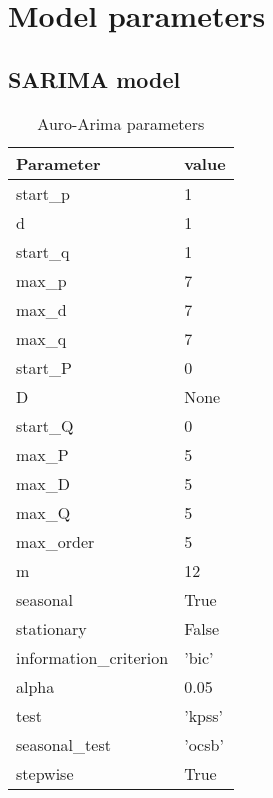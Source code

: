 \section{Model parameters}
\label{appendix:Model-Parameters}


\subsection{SARIMA model}

\begin{table}[H]
  \centering
  \caption{Auro-Arima parameters}
  \label{table:auto-arima-parameters}
  \begin{tabular}{|l|l|}\hline
    Parameter              & value   \\ \hline
    \hline
    start\_p               & 1       \\ \hline
    d                      & 1       \\ \hline
    start\_q               & 1       \\ \hline
    max\_p                 & 7       \\ \hline
    max\_d                 & 7       \\ \hline
    max\_q                 & 7       \\ \hline
    start\_P               & 0       \\ \hline
    D                      & None    \\ \hline
    start\_Q               & 0       \\ \hline
    max\_P                 & 5       \\ \hline
    max\_D                 & 5       \\ \hline
    max\_Q                 & 5       \\ \hline
    max\_order             & 5       \\ \hline
    m                      & 12      \\ \hline
    seasonal               & True    \\ \hline
    stationary             & False   \\ \hline
    information\_criterion & 'bic'   \\ \hline
    alpha                  & 0.05    \\ \hline
    test                   & 'kpss'  \\ \hline
    seasonal\_test         & 'ocsb'  \\ \hline
    stepwise               & True    \\ \hline

\end{tabular}
\end{table}
